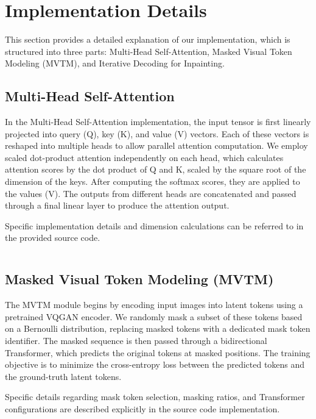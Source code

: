 \section{Implementation Details}
\label{sec:implementation}

This section provides a detailed explanation of our implementation, which is structured into three parts: Multi-Head Self-Attention, Masked Visual Token Modeling (MVTM), and Iterative Decoding for Inpainting.

\subsection{Multi-Head Self-Attention}
In the Multi-Head Self-Attention implementation, the input tensor is first linearly projected into query (Q), key (K), and value (V) vectors.
Each of these vectors is reshaped into multiple heads to allow parallel attention computation.
We employ scaled dot-product attention independently on each head, which calculates attention scores by the dot product of Q and K, scaled by the square root of the dimension of the keys.
After computing the softmax scores, they are applied to the values (V).
The outputs from different heads are concatenated and passed through a final linear layer to produce the attention output.

Specific implementation details and dimension calculations can be referred to in the provided source code.

\inputminted[firstline=4, lastline=35]{python}{../models/Transformer/modules/layers.py}

\subsection{Masked Visual Token Modeling (MVTM)}
The MVTM module begins by encoding input images into latent tokens using a pretrained VQGAN encoder.
We randomly mask a subset of these tokens based on a Bernoulli distribution, replacing masked tokens with a dedicated mask token identifier.
The masked sequence is then passed through a bidirectional Transformer, which predicts the original tokens at masked positions.
The training objective is to minimize the cross-entropy loss between the predicted tokens and the ground-truth latent tokens.

Specific details regarding mask token selection, masking ratios, and Transformer configurations are described explicitly in the source code implementation.
\inputminted[firstline=32, lastline=36]{python}{../models/VQGAN_Transformer.py}
\inputminted[firstline=60, lastline=71]{python}{../models/VQGAN_Transformer.py}

